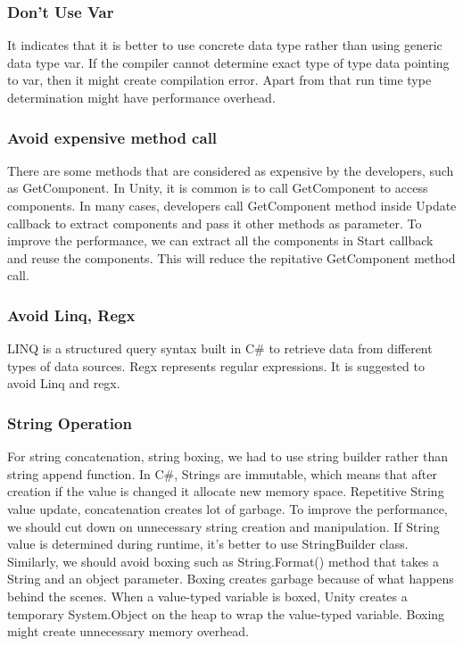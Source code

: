 \subsubsection{Don't Use Var}
It indicates that it is better to use concrete data type rather than using generic data type var. If the compiler cannot determine exact type of type data pointing to var, then it might create compilation error. Apart from that run time type determination might have performance overhead.


\subsubsection{Avoid expensive method call}
There are some methods that are considered as expensive by the developers, such as GetComponent. In Unity, it is common is to call GetComponent to access components. In many cases, developers call GetComponent method inside Update callback to extract components and pass it other methods as parameter. To improve the performance, we can extract all the components in Start callback and reuse the components. This will reduce the repitative GetComponent method call.

\subsubsection{Avoid Linq, Regx}
LINQ is a structured query syntax built in C\# to retrieve data from different types of data sources. Regx represents regular expressions. It is suggested to avoid Linq and regx.  

\subsubsection{String Operation}
For string concatenation, string boxing, we had to use string builder rather than string append function. In C\#, Strings are immutable, which means that after creation if the value is changed it allocate new memory space. Repetitive String value update, concatenation creates lot of garbage. To improve the performance, we should cut down on unnecessary string creation and manipulation. If String value is determined during runtime, it's better to use StringBuilder class. Similarly, we should avoid boxing such as String.Format() method that takes a String and an object parameter. Boxing creates garbage because of what happens behind the scenes. When a value-typed variable is boxed, Unity creates a temporary System.Object on the heap to wrap the value-typed variable. Boxing might create unnecessary memory overhead.


